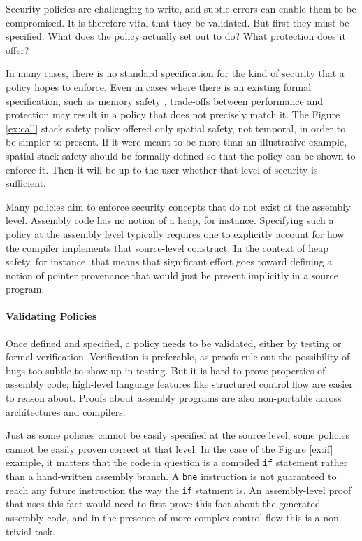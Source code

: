 \documentclass{report}
\begin{document}
Security policies are challenging to write, and subtle errors can enable them to be compromised.
It is therefore vital that they be validated. But first they must be specified. What does the
policy actually set out to do? What protection does it offer?

In many cases, there is no standard specification for the kind of security that a policy hopes
to enforce. Even in cases where there is an existing formal specification, such as
memory safety \cite{Azevedo+16}, trade-offs between performance and protection may result in a
policy that does not precisely match it. The Figure \ref{ex:call} stack safety policy offered
only spatial safety, not temporal, in order to be simpler to present. If it were meant to be more than
an illustrative example, spatial stack safety should be formally defined so that the policy can be
shown to enforce it. Then it will be up to the user whether that level of security is sufficient.

Many policies aim to enforce security concepts that do not exist at the assembly level. Assembly
code has no notion of a heap, for instance. Specifying such a policy at the assembly
level typically requires one to explicitly account for how the compiler implements that source-level
construct. In the context of heap safety, for instance, that means that significant effort goes
toward defining a notion of pointer provenance that would just be present implicitly in a
source program.

\paragraph{Validating Policies}

Once defined and specified, a policy needs to be validated, either by testing or formal verification.
Verification is preferable, as proofs rule out the possibility of bugs too subtle to show up in testing.
But it is hard to prove properties of assembly code; high-level language features like
structured control flow are easier to reason about. Proofs about assembly programs are
also non-portable across architectures and compilers.

Just as some policies cannot be easily specified at the source level, some policies cannot be easily
proven correct at that level. In the case of the Figure \ref{ex:if} example, it matters that the code
in question is a compiled {\tt if} statement rather than a hand-written assembly branch. A {\tt bne}
instruction is not guaranteed to reach any future instruction the way the {\tt if} statment is. An
assembly-level proof that uses this fact would need to first prove this fact about the generated
assembly code, and in the presence of more complex control-flow this is a non-trivial task.
\end{document}
